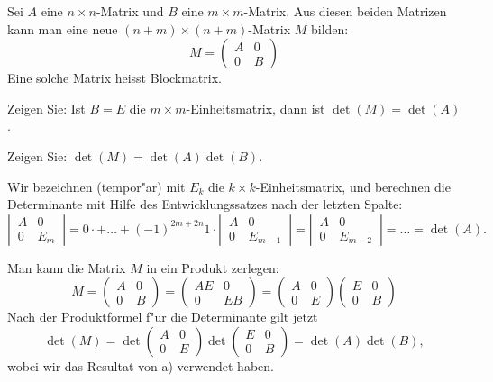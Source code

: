 Sei $A$ eine $n\times n$-Matrix und $B$ eine $m\times m$-Matrix. Aus diesen beiden
Matrizen kann man eine neue $(n+m)\times(n+m)$-Matrix $M$ bilden:
\[
M=\begin{pmatrix}
A&0\\
0&B
\end{pmatrix}
\]
Eine solche Matrix heisst Blockmatrix.
\begin{teilaufgaben}
\item
Zeigen Sie:
Ist $B=E$ die $m\times m$-Einheitsmatrix, dann ist $\det(M)=\det(A)$.
\item
Zeigen Sie:
$\det(M)=\det(A)\det(B)$.
\end{teilaufgaben}

\begin{loesung}
\begin{teilaufgaben}
\item Wir bezeichnen (tempor"ar) mit $E_k$ die $k\times k$-Einheitsmatrix,
und berechnen die Determinante mit Hilfe des Entwicklungssatzes nach der
letzten Spalte:
\[
\left|\,
\begin{matrix}
A&0\\
0&E_m
\end{matrix}
\,\right|
=0\cdot +\dots+(-1)^{2m+2n}1\cdot
\left|\,
\begin{matrix}
A&0\\
0&E_{m-1}
\end{matrix}
\,\right|
=
\left|\,
\begin{matrix}
A&0\\
0&E_{m-2}
\end{matrix}
\,\right|
=\dots=
\det(A).
\]

\item
Man kann die Matrix $M$ in ein Produkt zerlegen:
\[
M=
\begin{pmatrix}
A&0\\
0&B
\end{pmatrix}
=
\begin{pmatrix}
AE&0\\
0&EB
\end{pmatrix}
=
\begin{pmatrix}
A&0\\
0&E
\end{pmatrix}
\begin{pmatrix}
E&0\\
0&B
\end{pmatrix}
\]
Nach der Produktformel f"ur die Determinante gilt jetzt
\[
\det(M) =
\det
\begin{pmatrix}
A&0\\
0&E
\end{pmatrix}
\det
\begin{pmatrix}
E&0\\
0&B
\end{pmatrix}
=\det(A)\det(B),
\]
wobei wir das Resultat von a) verwendet haben.
\end{teilaufgaben}
\end{loesung}

